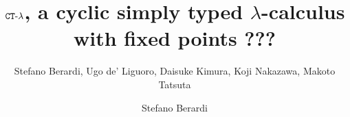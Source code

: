 \ifdraft

\title{${ {\tt CT} \mbox{-} \lambda}$, a cyclic simply typed $\lambda$-calculus with fixed points}

\author{Stefano Berardi,  Ugo de' Liguoro, Daisuke Kimura, Koji Nakazawa, Makoto Tatsuta}
\date{}

\else

\title[Equivalence]
{
???
}

\author[S. Berardi]{Stefano Berardi}
\address{Universit\`{a} di Torino,
Torino, Italy}


\fi

\maketitle

